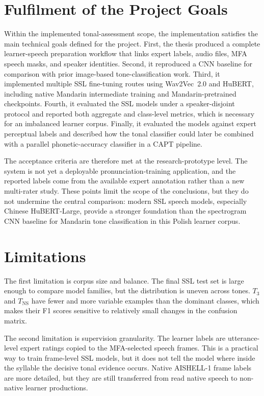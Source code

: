 \section{Fulfilment of the Project Goals}
\label{sec:summary:goals}

Within the implemented tonal-assessment scope, the implementation satisfies the
main technical goals defined for the project.
First, the thesis produced a complete learner-speech preparation workflow that
links expert labels, audio files, MFA speech masks, and speaker identities.
Second, it reproduced a CNN baseline for comparison with prior
image-based tone-classification work. Third, it implemented multiple SSL
fine-tuning routes using Wav2Vec~2.0 and HuBERT, including native Mandarin
intermediate training and Mandarin-pretrained checkpoints. Fourth, it evaluated
the SSL models under a speaker-disjoint protocol and reported both aggregate and
class-level metrics, which is necessary for an imbalanced learner corpus.
Finally, it evaluated the models against expert perceptual labels and described
how the tonal classifier could later be combined with a parallel
phonetic-accuracy classifier in a CAPT pipeline.

The acceptance criteria are therefore met at the research-prototype level. The
system is not yet a deployable pronunciation-training application, and the
reported labels come from the available expert annotation rather than a new
multi-rater study. These points limit the scope of the conclusions, but they do
not undermine the central comparison: modern SSL speech models,
especially Chinese HuBERT-Large, provide a stronger foundation than the
spectrogram CNN baseline for Mandarin tone classification in this Polish learner
corpus.

\section{Limitations}
\label{sec:summary:limitations}

The first limitation is corpus size and balance. The final SSL test set is large
enough to compare model families, but the distribution is uneven across tones.
\(T_3\) and \(T_{\mathrm{NS}}\) have fewer and more variable examples than the
dominant classes, which makes their F1 scores sensitive to relatively small
changes in the confusion matrix.

The second limitation is supervision granularity. The learner labels are
utterance-level expert ratings copied to the MFA-selected speech frames. This is
a practical way to train frame-level SSL models, but it does not tell the model
where inside the syllable the decisive tonal evidence occurs. Native AISHELL-1
frame labels are more detailed, but they are still transferred from read native
speech to non-native learner productions.

